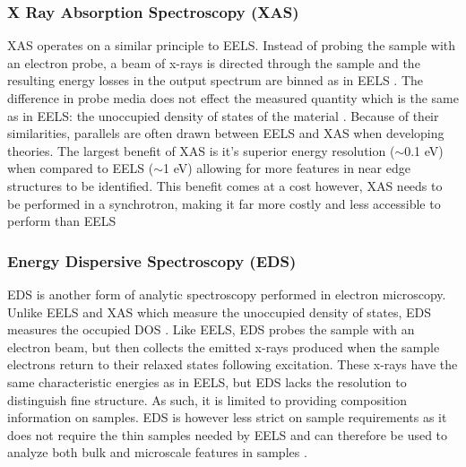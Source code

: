 \subsubsection{X Ray Absorption Spectroscopy (XAS)}
XAS operates on a similar principle to EELS.  Instead of probing the sample with an electron probe, a beam of x-rays is directed through the sample and the resulting energy losses in the output spectrum are binned as in EELS \cite{groot_high-resolution_2001}.  The difference in probe media does not effect the measured quantity which is the same as in EELS: the unoccupied density of states of the material \cite{groot_high-resolution_2001}.  Because of their similarities, parallels are often drawn between EELS and XAS when developing theories.  The largest benefit of XAS is it's superior energy resolution ($\sim$0.1 eV) when compared to EELS ($\sim$1 eV) allowing for more features in near edge structures to be identified\cite{Egerton, groot_high-resolution_2001}.  This benefit comes at a cost however, XAS needs to be performed in a synchrotron, making it far more costly and less accessible to perform than EELS


\subsubsection{Energy Dispersive Spectroscopy (EDS)}
EDS is another form of analytic spectroscopy performed in electron microscopy.   Unlike EELS and XAS which measure the unoccupied density of states, EDS measures the occupied DOS \cite{goldstein_electron_2003}.  Like EELS, EDS probes the sample with an electron beam, but then collects the emitted x-rays produced when the sample electrons return to their relaxed states following excitation.  These x-rays have the same characteristic energies as in EELS, but EDS lacks the resolution to distinguish fine structure.  As such, it is limited to providing composition information on samples.  EDS is however less strict on sample requirements as it does not require the thin samples needed by EELS and can therefore be used to analyze both bulk and microscale features in samples \cite{goldstein_electron_2003}.

